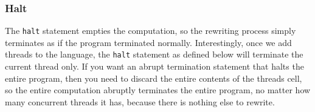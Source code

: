 \documentclass{article}
\begin{document}
\begin{kdefinition}
\begin{module}{}
\begin{kblock}[text]
 \subsubsection{Halt}
The \texttt{halt} statement empties the computation, so the rewriting process
simply terminates as if the program terminated normally.  Interestingly, once
we add threads to the language, the \texttt{halt} statement as defined below
will terminate the current thread only.  If you want an abrupt termination
statement that halts the entire program, then you need to discard the entire
contents of the \textsf{threads} cell, so the entire computation abruptly
terminates the entire program, no matter how many concurrent threads it has,
because there is nothing else to rewrite.  \end{kblock}
\begin{kblock}[text]

\end{kblock}
\end{module}
\end{kdefinition}
\end{document}
